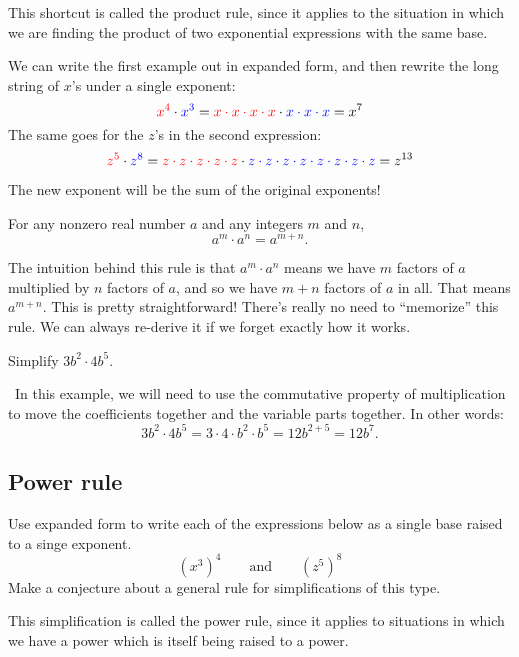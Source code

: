 This shortcut is called the product rule, since it applies to the situation in which we are finding the product of two exponential expressions with the same base.

We can write the first example out in expanded form, and then rewrite the long string of $x$'s under a single exponent:
\[{\color{red}x^4} \cdot {\color{blue}x^3} = {\color{red}x \cdot x \cdot x \cdot x} \cdot {\color{blue}x \cdot x \cdot x} = x^7\]
The same goes for the $z$'s in the second expression:
\[{\color{red}z^5} \cdot {\color{blue}z^8} = {\color{red}z \cdot z \cdot z \cdot z \cdot z} \cdot {\color{blue}z \cdot z \cdot z \cdot z \cdot z \cdot z \cdot z \cdot z} = z^{13}\]

The new exponent will be the sum of the original exponents!

\begin{boxdef}
For any nonzero real number $a$ and any integers $m$ and $n$, \[a^m \cdot a^n = a^{m+n}.\]
\end{boxdef}

The intuition behind this rule is that $a^m \cdot a^n$ means we have $m$ factors of $a$ multiplied by $n$ factors of $a$, and so we have $m+n$ factors of $a$ in all. That means $a^{m+n}$. This is pretty straightforward! There's really no need to ``memorize'' this rule. We can always re-derive it if we forget exactly how it works.

\begin{boxex}
Simplify $3b^2 \cdot 4b^5.$

\exsoln\ In this example, we will need to use the commutative property of multiplication to move the coefficients together and the variable parts together. In other words: \[3b^2 \cdot 4b^5 = 3\cdot4\cdot b^2 \cdot b^5 = 12b^{2+5} = 12b^7.\]
\end{boxex}


\subsection{Power rule}

\begin{boxexplore}[Derivation \#2]
Use expanded form to write each of the expressions below as a single base raised to a singe exponent.
\[(x^3)^4 \qquad\text{and}\qquad (z^5)^8\]
Make a conjecture about a general rule for simplifications of this type.
\end{boxexplore}

This simplification is called the power rule, since it applies to situations in which we have a power which is itself being raised to a power.

